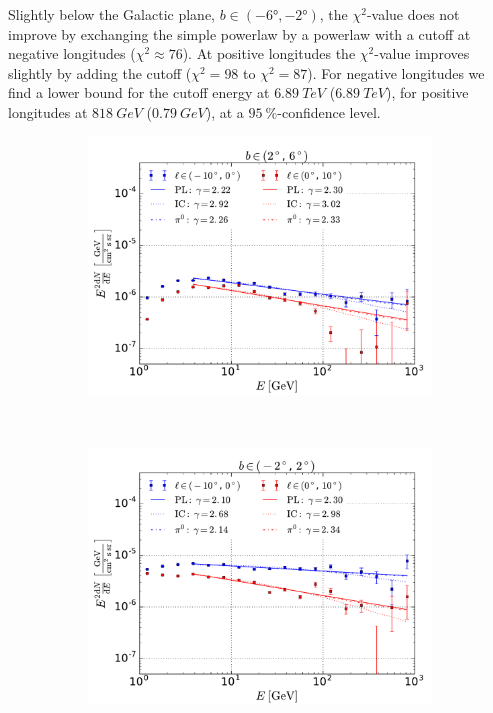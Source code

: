 Slightly below the Galactic plane, $b \in (-\ang{6}, -\ang{2})$, the $\chi^2$-value does not improve by exchanging the simple powerlaw by a powerlaw with a cutoff at negative longitudes ($\chi^2 \approx 76$). At positive longitudes the $\chi^2$-value improves slightly by adding the cutoff ($\chi^2 = 98$ to $\chi^2 = 87$). For negative longitudes we find a lower bound for the cutoff energy at $\SI{6.89}{TeV}$ ($\SI{6.89}{TeV}$), for positive longitudes at $\SI{818}{GeV}$ ($\SI{0.79}{GeV}$), at a $\SI{95}{\percent}$-confidence level.
\begin{figure}[h!]
    \begin{subfigure}{0.49\textwidth}
        \includegraphics[width=\textwidth]{plots/SED_boxes_source_4.pdf}
    \end{subfigure}\\
    \begin{subfigure}{0.49\textwidth}
        \includegraphics[width=\textwidth]{plots/SED_boxes_source_0.pdf}

\end{subfigure}
\end{figure}
